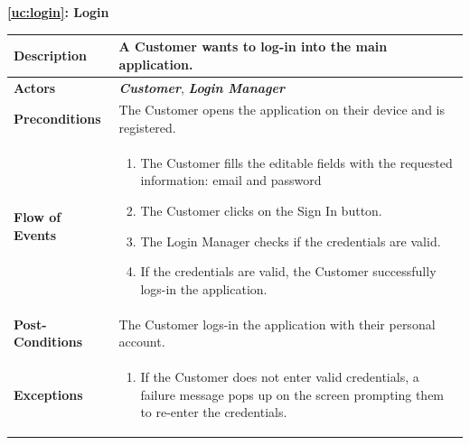 \documentclass[a4paper, 10pt, oneside]{article}
\begin{document}
\begin{center}
{\textbf{\ref{uc:login}: Login}}
\end{center}
\begin{tabularx}{\linewidth}{| l | X |}
	
	\hline
	\textbf{Description} & A Customer wants to log-in into the main application.\\
	

	\hline
	\textbf{Actors} & \textbf{\textit{Customer}}, \textbf{\textit{Login Manager}}\\
	
	\hline
	\textbf{Preconditions} & The Customer opens the application on their device and is registered.\\
	
	\hline
	\textbf{Flow of Events} & \parbox{0.7\textwidth}{	
		\begin{enumerate}
			\item The Customer fills the editable fields with the requested information: email and password
			\item The Customer clicks on the Sign In button.
			\item The Login Manager checks if the credentials are valid. 
			\item If the credentials are valid, the Customer successfully logs-in the application.
	\end{enumerate}}\\
	
	\hline
	\textbf{Post-Conditions} & The Customer logs-in the application with their personal account.\\
	
	\hline
	\textbf{Exceptions} & \parbox{0.7\textwidth}{ \begin{enumerate}
			\item If the Customer does not enter valid credentials, a failure message pops up on the screen prompting them to re-enter the credentials.
		\end{enumerate}}\\

	\hline
	
\end{tabularx}
\end{document}
